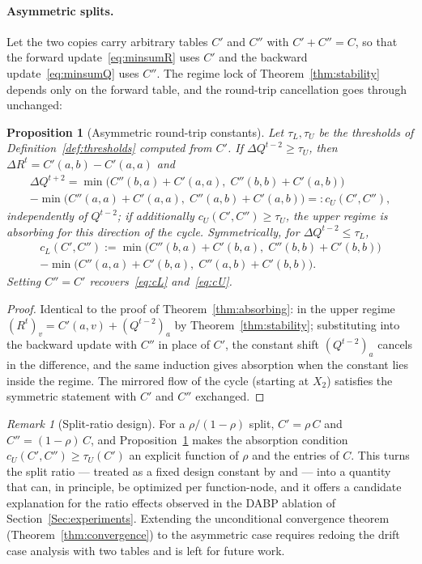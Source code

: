 \documentclass[letterpaper]{article} %
\newtheorem{proposition}[theorem]{Proposition}
\theoremstyle{definition}
\theoremstyle{remark}
\newtheorem{remark}[theorem]{Remark}
\begin{document}
\paragraph{Asymmetric splits.}
Let the two copies carry arbitrary tables $C'$ and $C''$ with $C' + C'' = C$, so that the forward update~\eqref{eq:minsumR} uses $C'$ and the backward update~\eqref{eq:minsumQ} uses $C''$. The regime lock of Theorem~\ref{thm:stability} depends only on the forward table, and the round-trip cancellation goes through unchanged:
\begin{proposition}[Asymmetric round-trip constants]\label{prop:asym}
Let $\tau_L, \tau_U$ be the thresholds of Definition~\ref{def:thresholds} computed from $C'$. If $\Delta Q^{t-2} \geq \tau_U$, then $\Delta R^t = C'(a,b) - C'(a,a)$ and
\begin{multline*}
    \Delta Q^{t+2} = \min\!\bigl(C''(b,a)+C'(a,a),\; C''(b,b)+C'(a,b)\bigr) \\
    - \min\!\bigl(C''(a,a)+C'(a,a),\; C''(a,b)+C'(a,b)\bigr) =: c_U(C',C''),
\end{multline*}
independently of $Q^{t-2}$; if additionally $c_U(C',C'') \geq \tau_U$, the upper regime is absorbing for this direction of the cycle. Symmetrically, for $\Delta Q^{t-2} \leq \tau_L$,
\begin{multline*}
    c_L(C',C'') := \min\!\bigl(C''(b,a)+C'(b,a),\; C''(b,b)+C'(b,b)\bigr) \\
    - \min\!\bigl(C''(a,a)+C'(b,a),\; C''(a,b)+C'(b,b)\bigr).
\end{multline*}
Setting $C'' = C'$ recovers~\eqref{eq:cL} and~\eqref{eq:cU}.
\end{proposition}
\begin{proof}
Identical to the proof of Theorem~\ref{thm:absorbing}: in the upper regime $(R^t)_v = C'(a,v) + (Q^{t-2})_a$ by Theorem~\ref{thm:stability}; substituting into the backward update with $C''$ in place of $C'$, the constant shift $(Q^{t-2})_a$ cancels in the difference, and the same induction gives absorption when the constant lies inside the regime. The mirrored flow of the cycle (starting at $X_2$) satisfies the symmetric statement with $C'$ and $C''$ exchanged.
\end{proof}
\begin{remark}[Split-ratio design]\label{rem:ratio}
For a $\rho/(1{-}\rho)$ split, $C' = \rho\, C$ and $C'' = (1{-}\rho)\, C$, and Proposition~\ref{prop:asym} makes the absorption condition $c_U(C',C'') \geq \tau_U(C')$ an explicit function of $\rho$ and the entries of $C$. This turns the split ratio --- treated as a fixed design constant by \citet{CohenGZ20} and \citet{DengKL022} --- into a quantity that can, in principle, be optimized per function-node, and it offers a candidate explanation for the ratio effects observed in the DABP ablation of Section~\ref{Sec:experiments}. Extending the unconditional convergence theorem (Theorem~\ref{thm:convergence}) to the asymmetric case requires redoing the drift case analysis with two tables and is left for future work.
\end{remark}
\end{document}
